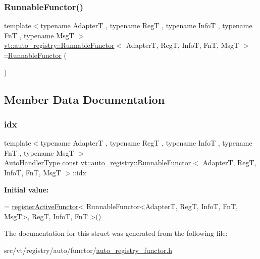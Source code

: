 \subsubsection{\texorpdfstring{Runnable\+Functor()}{RunnableFunctor()}}
{\footnotesize\ttfamily template$<$typename AdapterT , typename RegT , typename InfoT , typename FnT , typename MsgT $>$ \\
\hyperlink{structvt_1_1auto__registry_1_1_runnable_functor}{vt\+::auto\+\_\+registry\+::\+Runnable\+Functor}$<$ AdapterT, RegT, InfoT, FnT, MsgT $>$\+::\hyperlink{structvt_1_1auto__registry_1_1_runnable_functor}{Runnable\+Functor} (\begin{DoxyParamCaption}{ }\end{DoxyParamCaption})\hspace{0.3cm}{\ttfamily [default]}}



\subsection{Member Data Documentation}
\mbox{\label{structvt_1_1auto__registry_1_1_runnable_functor_a74064bd96047b8a1093848183ed28ed9}} 
\subsubsection{\texorpdfstring{idx}{idx}}
{\footnotesize\ttfamily template$<$typename AdapterT , typename RegT , typename InfoT , typename FnT , typename MsgT $>$ \\
\hyperlink{namespacevt_1_1auto__registry_ae295e18699146815bb7d7674594d95d7}{Auto\+Handler\+Type} const \hyperlink{structvt_1_1auto__registry_1_1_runnable_functor}{vt\+::auto\+\_\+registry\+::\+Runnable\+Functor}$<$ AdapterT, RegT, InfoT, FnT, MsgT $>$\+::idx\hspace{0.3cm}{\ttfamily [static]}}

{\bfseries Initial value\+:}
\begin{DoxyCode}
=
  \hyperlink{namespacevt_1_1auto__registry_ab7e130e8790e4df4dc1d35476d1736e0}{registerActiveFunctor}<
    RunnableFunctor<AdapterT, RegT, InfoT, FnT, MsgT>,
    RegT, InfoT, FnT
  >()
\end{DoxyCode}


The documentation for this struct was generated from the following file\+:\begin{DoxyCompactItemize}
\item 
src/vt/registry/auto/functor/\hyperlink{auto__registry__functor_8h}{auto\+\_\+registry\+\_\+functor.\+h}\end{DoxyCompactItemize}
